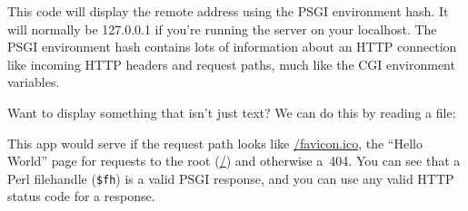 
This code will display the remote address using the PSGI environment
hash. It will normally be 127.0.0.1 if you're running the server on your
localhost. The PSGI environment hash contains lots of information about
an HTTP connection like incoming HTTP headers and request paths, much
like the CGI environment variables.

Want to display something that isn't just text? We can do this by
reading a file:


This app would serve  if the request path looks like
\url{/favicon.ico}, the ``Hello World'' page for requests to the root (\url{/}) and
otherwise a~404. You can see that a Perl filehandle (\lstinline!$fh!) is
a valid PSGI response, and you can use any valid HTTP status code for a
response.


